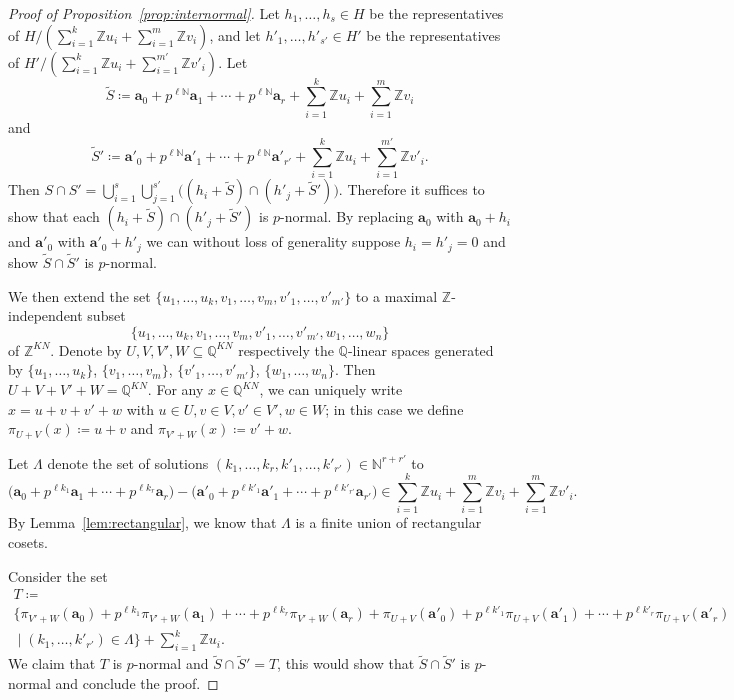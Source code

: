 \documentclass[letterpaper, 11pt, thm-restate]{article}
\numberwithin{equation}{section}
\newcommand{\Z}{\mathbb{Z}}
\newcommand{\N}{\mathbb{N}}
\newcommand{\Q}{\mathbb{Q}}
\newcommand{\tS}{\widetilde{S}}
\newcommand{\ba}{\boldsymbol{a}}
\theoremstyle{definition}
\theoremstyle{definition}
\theoremstyle{definition}
\begin{document}
\begin{proof}[Proof of Proposition~\ref{prop:internormal}]
    Let $h_1, \ldots, h_s \in H$ be the representatives of $H/(\sum_{i = 1}^k \Z u_i + \sum_{i = 1}^m \Z v_i)$, and let $h'_1, \ldots, h'_{s'} \in H'$ be the representatives of $H'/(\sum_{i = 1}^k \Z u_i + \sum_{i = 1}^{m'} \Z v'_i)$. 
    Let
    \[
    \tS \coloneqq \ba_0 + p^{\ell \N} \ba_1 + \cdots + p^{\ell \N} \ba_r + \sum_{i = 1}^k \Z u_i + \sum_{i = 1}^m \Z v_i
    \]
    and
    \[
    \tS' \coloneqq \ba'_0 + p^{\ell \N} \ba'_1 + \cdots + p^{\ell \N} \ba'_{r'} + \sum_{i = 1}^k \Z u_i + \sum_{i = 1}^{m'} \Z v'_i.
    \]
    Then $S \cap S' = \bigcup_{i = 1}^s \bigcup_{j = 1}^{s'} \big( (h_i + \tS) \cap (h'_j + \tS') \big)$.
    Therefore it suffices to show that each $(h_i + \tS) \cap (h'_j + \tS')$ is $p$-normal. By replacing $\ba_0$ with $\ba_0 + h_i$ and $\ba'_0$ with $\ba'_0 + h'_j$ we can without loss of generality suppose $h_i = h'_j = 0$ and show $\tS \cap \tS'$ is $p$-normal.
    
    We then extend the set $\{u_1, \ldots, u_k, v_1, \ldots, v_m, v'_1, \ldots, v'_{m'}\}$ to a maximal $\Z$-independent subset 
    \[
    \{u_1, \ldots, u_k, v_1, \ldots, v_m, v'_1, \ldots, v'_{m'}, w_1, \ldots, w_n\}
    \]
    of $\Z^{KN}$.
    Denote by $U, V, V', W \subseteq \Q^{KN}$ respectively the $\Q$-linear spaces generated by $\{u_1, \ldots, u_k\}$, $\{v_1, \ldots, v_m\}$, $\{v'_1, \ldots, v'_{m'}\}$, $\{w_1, \ldots, w_n\}$.
    Then $U + V + V' + W = \Q^{KN}$.
    For any $x \in \Q^{KN}$, we can uniquely write $x = u + v + v' + w$ with $u \in U, v \in V, v' \in V', w \in W$; in this case we define $\pi_{U+V}(x) \coloneqq u+v$ and $\pi_{V'+W}(x) \coloneqq v' + w$.
    
    Let $\Lambda$ denote the set of solutions $(k_1, \ldots, k_r, k'_1, \ldots, k'_{r'}) \in \N^{r + r'}$ to
    \begin{equation}\label{eq:defLambda}
    \Big(\ba_0 + p^{\ell k_1} \ba_1 + \cdots + p^{\ell k_r} \ba_r\Big) - \Big(\ba'_0 + p^{\ell k'_1} \ba'_1 + \cdots + p^{\ell k'_{r'}} \ba_{r'}\Big) \in \sum_{i = 1}^k \Z u_i + \sum_{i = 1}^m \Z v_i + \sum_{i = 1}^m \Z v'_i.
    \end{equation}
    By Lemma~\ref{lem:rectangular}, we know that $\Lambda$ is a finite union of rectangular cosets.
    
    Consider the set
    \begin{multline*}
    T \coloneqq \\
    \Big\{\pi_{V' + W}(\ba_0) + p^{\ell k_1} \pi_{V' + W}(\ba_1) + \cdots + p^{\ell k_r} \pi_{V' + W}(\ba_r) + \pi_{U + V}(\ba'_0) + p^{\ell k'_1} \pi_{U + V}(\ba'_1) + \cdots + p^{\ell k'_r} \pi_{U + V}(\ba'_r) \\
     \;\Big|\; (k_1, \ldots, k'_{r'}) \in \Lambda \Big\} + \sum_{i = 1}^k \Z u_i.
    \end{multline*}
    We claim that $T$ is $p$-normal and $\tS \cap \tS' = T$, this would show that $\tS \cap \tS'$ is $p$-normal and conclude the proof.


\end{proof}
\end{document}
